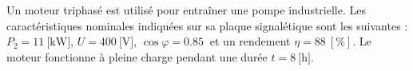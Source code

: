 \documentclass[a4paper,11pt,answers,addpoints]{exam}
\begin{document}
\begin{questions}
\question Un moteur triphasé est utilisé pour entraîner une pompe industrielle. Les caractéristiques nominales indiquées sur sa plaque signalétique sont les suivantes : $P_2 = \qty{11}{[\kilo\watt]}$, $U = \qty{400}{[\volt]}$, $\cos \varphi = \qty{0,85}{}$ et un rendement $\eta = \qty{88}{[\%]}$. Le moteur fonctionne à pleine charge pendant une durée $t = \qty{8}{[\hour]}$.

\end{questions}
\end{document}
